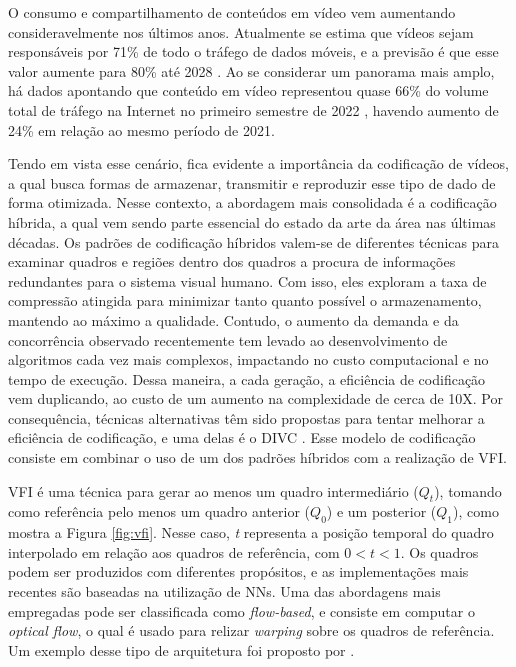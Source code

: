 O consumo e compartilhamento de conteúdos em vídeo vem aumentando consideravelmente nos últimos anos.
Atualmente se estima que vídeos sejam responsáveis por 71\% de todo o tráfego de dados móveis, e a previsão é que esse valor aumente para 80\% até 2028 \cite{mobile}.
Ao se considerar um panorama mais amplo, há dados apontando que conteúdo em vídeo representou quase 66\% do volume total de tráfego na Internet no primeiro semestre de 2022 \cite{traffic}, havendo aumento de 24\% em relação ao mesmo período de 2021.

Tendo em vista esse cenário, fica evidente a importância da codificação de vídeos, a qual busca formas de armazenar, transmitir e reproduzir esse tipo de dado de forma otimizada.
Nesse contexto, a abordagem mais consolidada é a codificação híbrida, a qual vem sendo parte essencial do estado da arte da área nas últimas décadas.
Os padrões de codificação híbridos valem-se de diferentes técnicas para examinar quadros e regiões dentro dos quadros a procura de informações redundantes para o sistema visual humano. Com isso, eles exploram a taxa de compressão atingida para minimizar tanto quanto possível o armazenamento, mantendo ao máximo a qualidade.
Contudo, o aumento da demanda e da concorrência observado recentemente tem levado ao desenvolvimento de algoritmos cada vez mais complexos, impactando no custo computacional e no tempo de execução.
Dessa maneira, a cada geração, a eficiência de codificação vem duplicando, ao custo de um aumento na complexidade de cerca de 10X.
Por consequência, técnicas alternativas têm sido propostas para tentar melhorar a eficiência de codificação, e uma delas é o \ac{DIVC} \cite{ours}.
Esse modelo de codificação consiste em combinar o uso de um dos padrões híbridos com a realização de \ac{VFI}.

\ac{VFI} é uma técnica para gerar ao menos um quadro intermediário ($Q_t$), tomando como referência pelo menos um quadro anterior ($Q_0$) e um posterior ($Q_1$), como mostra a Figura \ref{fig:vfi}.
Nesse caso, \textit{t} representa a posição temporal do quadro interpolado em relação aos quadros de referência, com $0<t<1$.
Os quadros podem ser produzidos com diferentes propósitos, e as implementações mais recentes são baseadas na utilização de \acp{NN}.
Uma das abordagens mais empregadas pode ser classificada como \textit{flow-based}, e consiste em computar o \textit{optical flow}, o qual é usado para relizar \textit{warping} sobre os quadros de referência.
Um exemplo desse tipo de arquitetura foi proposto por \textcite{niklaus2020softmax}.

